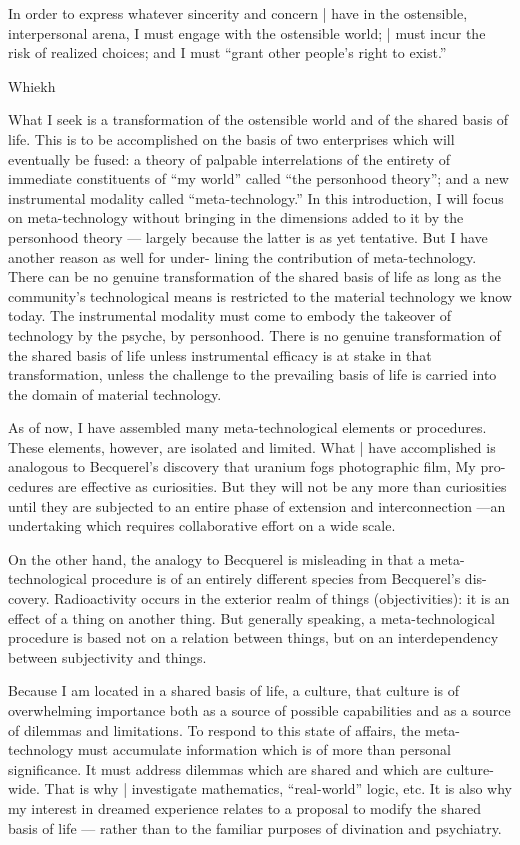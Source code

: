 In order to express whatever sincerity and concern | have in the ostensible, 
interpersonal arena, I must engage with the ostensible world; | must incur the risk 
of realized choices; and I must “grant other people's right to exist.” 


Whiekh 


What I seek is a transformation of the ostensible world and of the shared basis of life. 
This is to be accomplished on the basis of two enterprises which will eventually be 
fused: a theory of palpable interrelations of the entirety of immediate constituents 
of “my world” called “the personhood theory”; and a new instrumental modality 
called “meta-technology.” In this introduction, I will focus on meta-technology 
without bringing in the dimensions added to it by the personhood theory — largely 
because the latter is as yet tentative. But I have another reason as well for under- 
lining the contribution of meta-technology. There can be no genuine transformation 
of the shared basis of life as long as the community's technological means is restricted to the 
material technology we know today. The instrumental modality must come to embody the 
takeover of technology by the psyche, by personhood. There is no genuine transformation 
of the shared basis of life unless instrumental efficacy is at stake in that transformation, 
unless the challenge to the prevailing basis of life is carried into the domain of material 
technology. 

As of now, I have assembled many meta-technological elements or procedures. 
These elements, however, are isolated and limited. What | have accomplished is 
analogous to Becquerel's discovery that uranium fogs photographic film, My pro- 
cedures are effective as curiosities. But they will not be any more than curiosities 
until they are subjected to an entire phase of extension and interconnection —an 
undertaking which requires collaborative effort on a wide scale. 

On the other hand, the analogy to Becquerel is misleading in that a meta- 
technological procedure is of an entirely different species from Becquerel’s dis- 
covery. Radioactivity occurs in the exterior realm of things (objectivities): it is an 
effect of a thing on another thing. But generally speaking, a meta-technological 
procedure is based not on a relation between things, but on an interdependency 
between subjectivity and things. 

Because I am located in a shared basis of life, a culture, that culture is of 
overwhelming importance both as a source of possible capabilities and as a source 
of dilemmas and limitations. To respond to this state of affairs, the meta-technology 
must accumulate information which is of more than personal significance. It must 
address dilemmas which are shared and which are culture-wide. That is why | 
investigate mathematics, “real-world” logic, etc. It is also why my interest in 
dreamed experience relates to a proposal to modify the shared basis of life — rather 
than to the familiar purposes of divination and psychiatry. 

